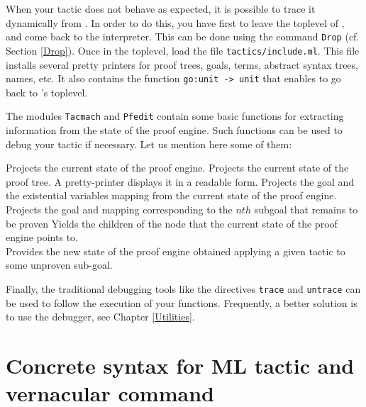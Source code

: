 When your tactic does not behave as expected, it is possible to trace
it dynamically from \Coq. In order to do this, you have first to leave
the toplevel of \Coq, and come back to the \ocaml{} interpreter. This can
be done using the command \texttt{Drop} (cf. Section \ref{Drop}). Once
in the \ocaml{} toplevel, load the file \texttt{tactics/include.ml}.
This file installs several pretty printers for proof trees, goals,
terms, abstract syntax trees, names, etc.  It also contains the
function \texttt{go:unit -> unit} that enables to go back to \Coq's
toplevel. 

The modules \texttt{Tacmach} and \texttt{Pfedit} contain some basic
functions for extracting information from the state of the proof
engine. Such functions can be used to debug your tactic if
necessary. Let us mention here some of them:

\begin{description}
    {Projects the current state of the proof engine.}
    {Projects the current state of the proof tree. A pretty-printer 
      displays it in a readable form.  }
    {Projects the goal and the existential variables mapping from
     the current state of the proof engine.} 
    {Projects the goal and mapping corresponding to the $nth$ subgoal
     that remains to be proven}
    {Yields the children of the node that the current state of the 
     proof engine points to.}
     {\\ Provides the new state of the proof engine obtained applying 
      a given tactic to some unproven sub-goal.}
\end{description}

Finally, the traditional \ocaml{} debugging tools like the directives
\texttt{trace} and \texttt{untrace} can be used to follow the
execution of your functions. Frequently, a better solution is to use
the \ocaml{} debugger, see Chapter \ref{Utilities}.

\section[Concrete syntax for ML tactic and vernacular command]{Concrete syntax for ML tactic and vernacular command\label{Notations-for-ML-command}}

